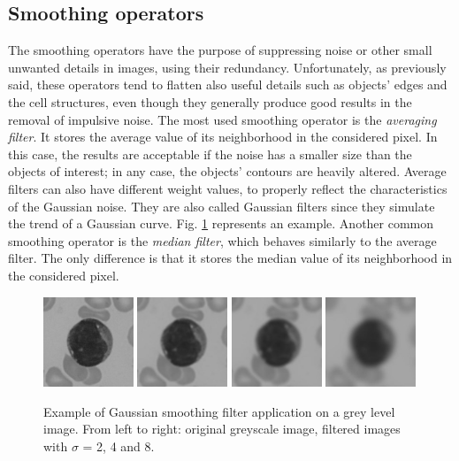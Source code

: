 \documentclass[final,a4paper,12pt,english]{UnicaPhdThesis3}
\begin{document}
\subsection{Smoothing operators} %
The smoothing operators have the purpose of suppressing noise or other small unwanted details in images, using their redundancy. Unfortunately, as previously said, these operators tend to flatten also useful details such as objects' edges and the cell structures, even though they generally produce good results in the removal of impulsive noise. The most used smoothing operator is the \textit{averaging filter}. It stores the average value of its neighborhood in the considered pixel. In this case, the results are acceptable if the noise has a smaller size than the objects of interest; in any case, the objects' contours are heavily altered. Average filters can also have different weight values, to properly reflect the characteristics of the Gaussian noise. They are also called Gaussian filters since they simulate the trend of a Gaussian curve. Fig. \ref{fig:smoothing} represents an example. Another common smoothing operator is the \textit{median filter}, which behaves similarly to the average filter. The only difference is that it stores the median value of its neighborhood in the considered pixel.

\begin{figure}[!h]
	\centering
	\includegraphics[width=0.24\textwidth]{images/smooth0}
	\includegraphics[width=0.24\textwidth]{images/smooth1}
	\includegraphics[width=0.24\textwidth]{images/smooth2}
	\includegraphics[width=0.24\textwidth]{images/smooth3}
	\caption{\label{fig:smoothing}Example of Gaussian smoothing filter application on a grey level image. From left to right: original greyscale image, filtered images with $\sigma$ = 2, 4 and 8.}
\end{figure}
\end{document}
